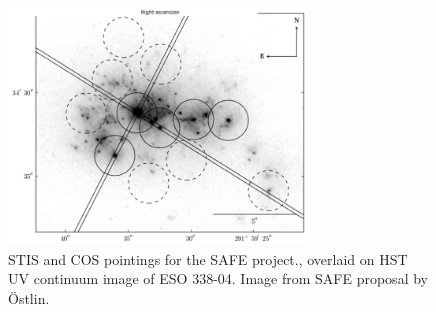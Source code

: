 \documentclass[10pt, letterpaper, headings=Large, DIV=14]{scrartcl}
\begin{document}
\begin{figure}[h] %
   \centering
   \includegraphics[width=0.7\textwidth]{SAFEpointings.png} 
   \caption{STIS and COS pointings for the SAFE project., overlaid on HST UV
   continuum image of ESO 338-04. Image from SAFE proposal by Östlin.}
   \label{fig:example}
\end{figure}

\end{document}
